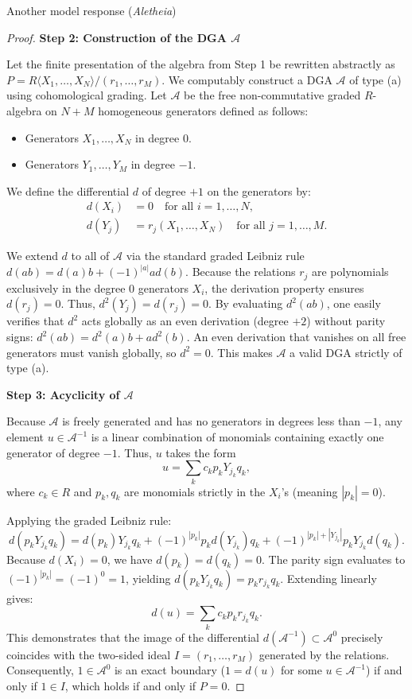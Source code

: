 \documentclass{article}
\theoremstyle{plain}
\theoremstyle{definition}
\begin{document}
\begin{solution}{Another model response (\emph{Aletheia})}
\begin{proof}
\textbf{Step 2: Construction of the DGA $\mathcal{A}$}

Let the finite presentation of the algebra from Step 1 be rewritten abstractly as $P = R\langle X_1, \dots, X_N \rangle / (r_1, \dots, r_M)$. We computably construct a DGA $\mathcal{A}$ of type (a) using cohomological grading. Let $\mathcal{A}$ be the free non-commutative graded $R$-algebra on $N+M$ homogeneous generators defined as follows:
\begin{itemize}
    \item Generators $X_1, \dots, X_N$ in degree $0$.
    \item Generators $Y_1, \dots, Y_M$ in degree $-1$.
\end{itemize}

We define the differential $d$ of degree $+1$ on the generators by:
\begin{align*}
    d(X_i) &= 0 \quad \text{for all } i = 1, \dots, N, \\
    d(Y_j) &= r_j(X_1, \dots, X_N) \quad \text{for all } j = 1, \dots, M.
\end{align*}

We extend $d$ to all of $\mathcal{A}$ via the standard graded Leibniz rule $d(ab) = d(a)b + (-1)^{|a|}a d(b)$. Because the relations $r_j$ are polynomials exclusively in the degree $0$ generators $X_i$, the derivation property ensures $d(r_j) = 0$. Thus, $d^2(Y_j) = d(r_j) = 0$. By evaluating $d^2(ab)$, one easily verifies that $d^2$ acts globally as an even derivation (degree $+2$) without parity signs: $d^2(ab) = d^2(a)b + a d^2(b)$. An even derivation that vanishes on all free generators must vanish globally, so $d^2 = 0$. This makes $\mathcal{A}$ a valid DGA strictly of type (a).

\textbf{Step 3: Acyclicity of $\mathcal{A}$}

Because $\mathcal{A}$ is freely generated and has no generators in degrees less than $-1$, any element $u \in \mathcal{A}^{-1}$ is a linear combination of monomials containing exactly one generator of degree $-1$. Thus, $u$ takes the form
\[
    u = \sum_k c_k p_k Y_{j_k} q_k,
\]
where $c_k \in R$ and $p_k, q_k$ are monomials strictly in the $X_i$'s (meaning $|p_k| = 0$).

Applying the graded Leibniz rule:
\[
    d(p_k Y_{j_k} q_k) = d(p_k) Y_{j_k} q_k + (-1)^{|p_k|} p_k d(Y_{j_k}) q_k + (-1)^{|p_k| + |Y_{j_k}|} p_k Y_{j_k} d(q_k).
\]
Because $d(X_i) = 0$, we have $d(p_k) = d(q_k) = 0$. The parity sign evaluates to $(-1)^{|p_k|} = (-1)^0 = 1$, yielding $d(p_k Y_{j_k} q_k) = p_k r_{j_k} q_k$. Extending linearly gives:
\[
    d(u) = \sum_k c_k p_k r_{j_k} q_k.
\]
This demonstrates that the image of the differential $d(\mathcal{A}^{-1}) \subset \mathcal{A}^0$ precisely coincides with the two-sided ideal $I = (r_1, \dots, r_M)$ generated by the relations. Consequently, $1 \in \mathcal{A}^0$ is an exact boundary ($1 = d(u)$ for some $u \in \mathcal{A}^{-1}$) if and only if $1 \in I$, which holds if and only if $P = 0$.


\end{proof}
\end{solution}
\end{document}
